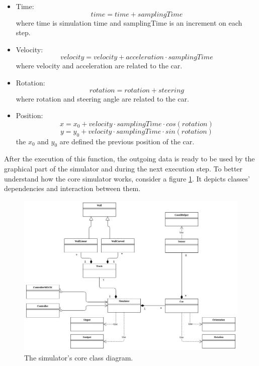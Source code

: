 \begin{itemize}
    \item Time:
        \begin{equation}
            time = time + samplingTime
        \end{equation} \newline
        where time is simulation time and samplingTime is an increment on each step. 
    \item Velocity:
    \begin{equation}
        velocity = velocity + acceleration \cdot samplingTime
    \end{equation} \newline
        where velocity and acceleration are related to the car.
    \item Rotation:
    \begin{equation}
        rotation = rotation + steering
    \end{equation} \newline
        where rotation and steering angle are related to the car.
    \item Position:
    \begin{equation}
        x = x_0 + velocity \cdot samplingTime \cdot cos(rotation)
    \end{equation}
    \begin{equation}
        y = y_0 + velocity \cdot samplingTime \cdot sin(rotation)
    \end{equation} \newline
    the $x_0$ and $y_0$ are defined the previous position of the car.
\end{itemize}
After the execution of this function, the outgoing data is ready to be used by the graphical part of the simulator and during the next execution step. To better understand how the core simulator works, consider a figure \ref{fig:class-diagram}. It depicts classes' dependencies and interaction between them. \newline
\begin{figure}[h!]
    \centering
    \includegraphics[width=\linewidth]{src/pic/class-diagram}
    \caption{The simulator's core class diagram.}
    \label{fig:class-diagram}
\end{figure} \newline
